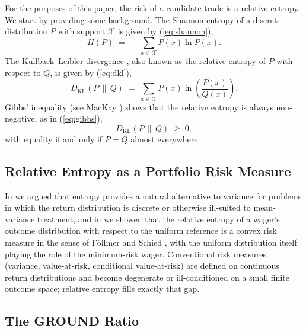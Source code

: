 \documentclass[11pt]{article}
\newcommand{\dkl}{D_{\mathrm{KL}}}
\begin{document}
For the purposes of this paper, the risk of a candidate trade is a relative
entropy. We start by providing some background. The Shannon entropy
\cite{shannon1948} of a discrete distribution $P$ with support $\mathcal{X}$
is given by (\ref{eq:shannon}),
\begin{equation}
H(P) \;=\; -\sum_{x \in \mathcal{X}} P(x) \ln P(x).
\label{eq:shannon}
\end{equation}
The Kullback--Leibler divergence \cite{kullback1951}, also known as the
relative entropy of $P$ with respect to $Q$, is given by (\ref{eq:dkl}),
\begin{equation}
\dkl(P \,\|\, Q) \;=\; \sum_{x \in \mathcal{X}} P(x)
\ln\!\left(\frac{P(x)}{Q(x)}\right).
\label{eq:dkl}
\end{equation}
Gibbs' inequality (see MacKay \cite{mackay2003}) shows that the relative
entropy is always non-negative, as in (\ref{eq:gibbs}),
\begin{equation}
\dkl(P \,\|\, Q) \;\geq\; 0,
\label{eq:gibbs}
\end{equation}
with equality if and only if $P = Q$ almost everywhere.

\subsection{Relative Entropy as a Portfolio Risk Measure}

In \cite{mercurio2020repo} we argued that entropy provides a natural
alternative to variance for problems in which the return distribution is
discrete or otherwise ill-suited to mean-variance treatment, and in
\cite{mercurio2020binary} we showed that the relative entropy of a wager's
outcome distribution with respect to the uniform reference is a convex risk
measure in the sense of F\"ollmer and Schied \cite{follmer2002}, with the
uniform distribution itself playing the role of the minimum-risk wager.
Conventional risk measures (variance, value-at-risk, conditional
value-at-risk) are defined on continuous return distributions and become
degenerate or ill-conditioned on a small finite outcome space; relative
entropy fills exactly that gap.

\subsection{The GROUND Ratio}
\label{sec:groundratio}
\end{document}
